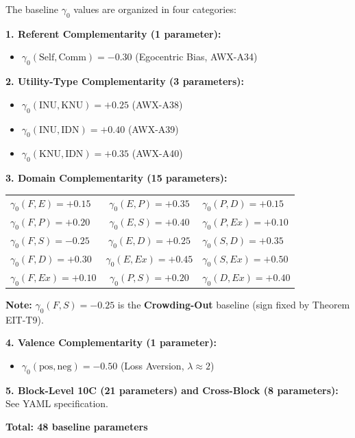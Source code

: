 \begin{tcolorbox}[colback=gray!5!white, colframe=gray!75!black,
    title=\textbf{EIT-EMP-1-D2: The 48 Baseline Parameters}]

The baseline $\gamma_0$ values are organized in four categories:

\textbf{1. Referent Complementarity (1 parameter):}
\begin{itemize}[nosep]
    \item $\gamma_0(\text{Self}, \text{Comm}) = -0.30$ \quad (Egocentric Bias, AWX-A34)
\end{itemize}

\textbf{2. Utility-Type Complementarity (3 parameters):}
\begin{itemize}[nosep]
    \item $\gamma_0(\text{INU}, \text{KNU}) = +0.25$ \quad (AWX-A38)
    \item $\gamma_0(\text{INU}, \text{IDN}) = +0.40$ \quad (AWX-A39)
    \item $\gamma_0(\text{KNU}, \text{IDN}) = +0.35$ \quad (AWX-A40)
\end{itemize}

\textbf{3. Domain Complementarity (15 parameters):}
\begin{center}
\small
\begin{tabular}{@{}lcl@{}}
$\gamma_0(F, E) = +0.15$ & $\gamma_0(E, P) = +0.35$ & $\gamma_0(P, D) = +0.15$ \\
$\gamma_0(F, P) = +0.20$ & $\gamma_0(E, S) = +0.40$ & $\gamma_0(P, Ex) = +0.10$ \\
$\gamma_0(F, S) = \mathbf{-0.25}$ & $\gamma_0(E, D) = +0.25$ & $\gamma_0(S, D) = +0.35$ \\
$\gamma_0(F, D) = +0.30$ & $\gamma_0(E, Ex) = +0.45$ & $\gamma_0(S, Ex) = +0.50$ \\
$\gamma_0(F, Ex) = +0.10$ & $\gamma_0(P, S) = +0.20$ & $\gamma_0(D, Ex) = +0.40$ \\
\end{tabular}
\end{center}

\textbf{Note:} $\gamma_0(F, S) = -0.25$ is the \textbf{Crowding-Out} baseline (sign fixed by Theorem EIT-T9).

\textbf{4. Valence Complementarity (1 parameter):}
\begin{itemize}[nosep]
    \item $\gamma_0(\text{pos}, \text{neg}) = -0.50$ \quad (Loss Aversion, $\lambda \approx 2$)
\end{itemize}

\textbf{5. Block-Level 10C (21 parameters) and Cross-Block (8 parameters):} See YAML specification.

\textbf{Total: 48 baseline parameters}

\end{tcolorbox}

